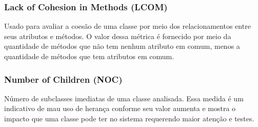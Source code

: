 \documentclass[conference]{IEEEtran}
\begin{document}
%	


\subsubsection{\textbf{Lack of Cohesion in Methods (LCOM)}} Usado para avaliar a
coesão de uma classe por meio dos relacionamentos entre seus atributos e métodos.
O valor dessa métrica é fornecido por meio da quantidade de métodos que não tem
nenhum atributo em comum, menos a quantidade de métodos que tem atributos em
comum.

	




\subsubsection{\textbf{Number of Children (NOC)}} Número de subclasses imediatas
de uma classe analisada. Essa medida é um indicativo de mau uso de herança conforme seu
valor aumenta e mostra o impacto que uma classe pode ter no sistema requerendo maior
atenção e testes.
\end{document}

